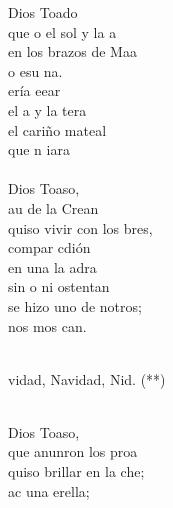 \begin{cancion}%
	 Dios Toado \\
	que o el sol y la a\\
	en los brazos de Maa \\
	o esu na.\\
	ería eear \\
	el a y la tera\\
	el cariño mateal \\
	que n  iara\\
\jump\\
	 Dios Toaso,\\
	au de la Crean\\
	quiso vivir con los bres,\\
	compar  cdión\\
	en una la adra \\
	sin o ni ostentan\\
	se hizo uno de notros;\\
	nos mos  can.  \\\jump\\
	\begin{chorus}%
	vidad, Navidad, Nid. (**)\\
	\end{chorus}%
	\jump\\
	 Dios Toaso, \\
	que anunron los proa\\
	quiso brillar en la che; \\
	  ac una erella;\\

\end{cancion}
